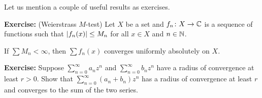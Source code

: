 \documentclass[10pt,aspectratio=169]{beamer}
\begin{document}
\begin{frame}
Let us mention a couple of useful results as exercises.

\medskip
\pause

\textbf{Exercise:}
(Weierstrass $M$-test)
Let $X$ be a set and $f_n \colon X \to {\mathbb{C}}$ is
a sequence of functions such that
$\left\lvert {f_n(x)} \right\rvert \leq M_n$ for all $x \in X$ and $n \in {\mathbb{N}}$.

\medskip
\pause

If $\sum M_n < \infty$, then $\sum f_n(x)$ converges uniformly absolutely on $X$.

\medskip
\pause

\textbf{Exercise:}
Suppose
$\sum_{n=0}^\infty a_n z^{n}$ and $\sum_{n=0}^\infty b_n z^{n}$
have a radius of convergence at least $r > 0$.  Show that
$\sum_{n=0}^\infty (a_n+b_n) z^{n}$ has a radius of convergence at least
$r$ and converges to the sum of the two series.
\end{frame}
\end{document}
